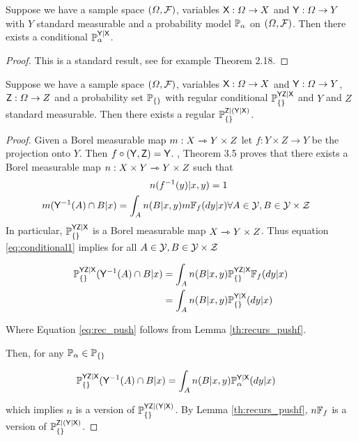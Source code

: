 \begin{theorem}\label{th:reg_cond}
Suppose we have a sample space $(\Omega,\mathcal{F})$, variables $\mathsf{X}:\Omega\to X$ and $\mathsf{Y}:\Omega\to Y$ with $Y$ standard measurable and a probability model $\mathbb{P}_{\alpha}$ on $(\Omega,\mathcal{F})$. Then there exists a conditional $\mathbb{P}_\alpha^{\mathsf{Y}|\mathsf{X}}$.
\end{theorem}

\begin{proof}
This is a standard result, see for example \cite{cinlar_probability_2011} Theorem 2.18.
\end{proof}

\begin{theorem}\label{th:ho_cond_psets}
Suppose we have a sample space $(\Omega,\mathcal{F})$, variables $\mathsf{X}:\Omega\to X$ and $\mathsf{Y}:\Omega\to Y$, $\mathsf{Z}:\Omega\to Z$ and a probability set $\mathbb{P}_{\{\}}$ with regular conditional $\mathbb{P}_{\{\}}^{\mathsf{YZ}|\mathsf{X}}$ and $Y$ and $Z$ standard measurable. Then there exists a regular $\mathbb{P}_{\{\}}^{\mathsf{Z}|(\mathsf{Y}|\mathsf{X})}$.
\end{theorem}

\begin{proof}
Given a Borel measurable map $m:X\rightarrowtriangle Y\times Z$ let $f:Y\times Z\to Y$ be the projection onto $Y$. Then $f\circ (\mathsf{Y},\mathsf{Z})=\mathsf{Y}$. \citet{bogachev_kantorovich_2020}, Theorem 3.5 proves that there exists a Borel measurable map $n:X\times Y\rightarrowtriangle Y\times Z$  such that 
\begin{align}
    n(f^{-1}(y)|x,y) = 1\label{eq:proper}\\
    m(\mathsf{Y}^{-1}(A)\cap B|x) = \int_A n(B|x,y) m\mathbb{F}_{f}(dy|x)&\forall A\in \mathcal{Y},B\in\mathcal{Y\times Z}\label{eq:conditional1}
\end{align}
In particular, $\mathbb{P}_{\{\}}^{\mathsf{YZ}|\mathsf{X}}$ is a Borel measurable map $X\rightarrowtriangle Y\times Z$. Thus equation \ref{eq:conditional1} implies for all $A\in \mathcal{Y},B\in\mathcal{Y\times Z}$

\begin{align}
    \mathbb{P}_{\{\}}^{\mathsf{YZ}|\mathsf{X}}(\mathsf{Y}^{-1}(A)\cap B|x) &= \int_A n(B|x,y) \mathbb{P}_{\{\}}^{\mathsf{YZ}|\mathsf{X}}\mathbb{F}_{f}(dy|x)\\
    &=\int_A n(B|x,y) \mathbb{P}_{\{\}}^{\mathsf{Y}|\mathsf{X}}(dy|x)\label{eq:rec_push}
\end{align}

Where Equation \ref{eq:rec_push} follows from Lemma \ref{th:recurs_pushf}.

Then, for any $\mathbb{P}_\alpha\in\mathbb{P}_{\{\}}$

\begin{align}
    \mathbb{P}_{\{\}}^{\mathsf{YZ}|\mathsf{X}}(\mathsf{Y}^{-1}(A)\cap B|x) &= \int_A n(B|x,y) \mathbb{P}_{\alpha}^{\mathsf{Y}|\mathsf{X}}(dy|x)
\end{align}

which implies $n$ is a version of $\mathbb{P}_{\{\}}^{\mathsf{YZ}|(\mathsf{Y}|\mathsf{X})}$. By Lemma \ref{th:recurs_pushf}, $n\mathbb{F}_{f}$ is a version of $\mathbb{P}_{\{\}}^{\mathsf{Z}|(\mathsf{Y}|\mathsf{X})}$.
\end{proof}

